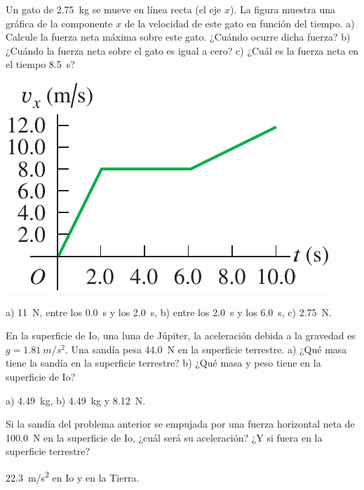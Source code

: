 \documentclass[11pt]{article}
\begin{document}
\begin{multicols}{2}
\begin{exercise}
Un gato de \qty{2.75}{kg} se mueve en línea recta (el eje $x$). La figura muestra una gráfica de la componente $x$ de la velocidad de este gato en función del tiempo. a) Calcule la fuerza neta máxima sobre este gato. ¿Cuándo ocurre dicha fuerza? b) ¿Cuándo la fuerza neta sobre el gato es igual a cero? c) ¿Cuál es la fuerza neta en el tiempo \qty{8.5}{s}?
\begin{center}
    \includegraphics[scale=0.45]{figs/prob-02.png}
\end{center}
\end{exercise}
\begin{solution}
    a) \qty{11}{N}, entre los \qty{0.0}{s} y los \qty{2.0}{s}, b) entre los \qty{2.0}{s} y los \qty{6.0}{s}, c) \qty{2.75}{N}.
\end{solution}
\end{multicols}

\begin{multicols}{2}
\begin{exercise}
    En la superficie de Io, una luna de Júpiter, la aceleración debida a la gravedad es $g = \qty{1.81}{m/s^2}$. Una sandía pesa \qty{44.0}{N} en la superficie terrestre. a) ¿Qué masa tiene la sandía en la superficie terrestre? b) ¿Qué masa y peso tiene en la superficie de Io?
\end{exercise}
\begin{solution}
    a) \qty{4.49}{kg}, b) \qty{4.49}{kg} y \qty{8.12}{N}.
\end{solution}
\end{multicols}

\begin{multicols}{2}
\begin{exercise}
    Si la sandía del problema anterior se empujada por una fuerza horizontal neta de \qty{100.0}{N} en la superficie de Io, ¿cuál será su aceleración? ¿Y si fuera en la superficie terrestre?
\end{exercise}
\begin{solution}
    \qty{22.3}{m/s^2} en Io y en la Tierra.
\end{solution}
\end{multicols}
\end{document}
